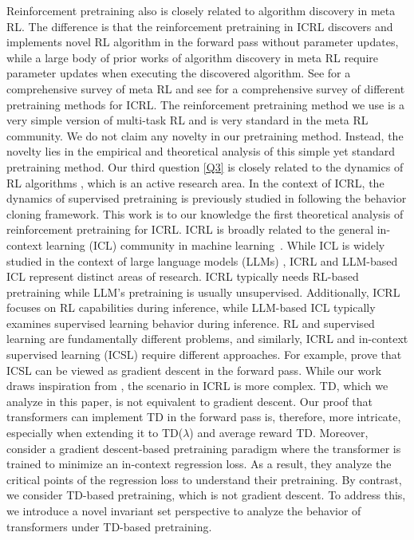 \documentclass{article}
\begin{document}
Reinforcement pretraining also is closely related to algorithm discovery in meta RL.
The difference is that the reinforcement pretraining in ICRL discovers and implements novel RL algorithm in the forward pass without parameter updates,
while a large body of prior works of algorithm discovery in meta RL \citep{kirsch2019improving,oh2020discovering,lu2022discovered} require parameter updates when executing the discovered algorithm.
See \citet{beck2023survey} for a comprehensive survey of meta RL
and see \citet{moeini2025survey} for a comprehensive survey of different pretraining methods for ICRL.
The reinforcement pretraining method we use is a very simple version of multi-task RL and is very standard in the meta RL community.
We do not claim any novelty in our pretraining method.
Instead,
the novelty lies in the empirical and theoretical analysis of this simple yet standard pretraining method.
Our third question \ref{Q3} is closely related to the dynamics of RL algorithms \citep{borkar2000ode,bhandari2018finite,cai2019neural,qian2024almost,liu2024ode},
which is an active research area.
In the context of ICRL,
the dynamics of supervised pretraining is previously studied in \citet{lin2023transformers} following the behavior cloning framework.
This work is to our knowledge the first theoretical analysis of reinforcement pretraining for ICRL.
ICRL is broadly related to the general in-context learning (ICL) community in machine learning~\citep{garg2022can,muller2022transformers,akyurek2023learning,vonoswald2023transformers,zhao2023transformers,allen2023physics,mahankali2023one,ahn2024transformers,zhang2024trained}.
While ICL is widely studied in the context of large language models (LLMs) \citep{brown2020incontext}, ICRL and LLM-based ICL represent distinct areas of research.
ICRL typically needs RL-based pretraining while LLM's pretraining is usually unsupervised.
Additionally, ICRL focuses on RL capabilities during inference, while LLM-based ICL typically examines supervised learning behavior during inference.
RL and supervised learning are fundamentally different problems, and similarly, ICRL and in-context supervised learning (ICSL) require different approaches.
For example, \citet{ahn2024transformers} prove that ICSL can be viewed as gradient descent in the forward pass. While our work draws inspiration from \citet{ahn2024transformers}, the scenario in ICRL is more complex.
TD, which we analyze in this paper, is not equivalent to gradient descent.
Our proof that transformers can implement TD in the forward pass is, therefore, more intricate, especially when extending it to TD($\lambda$) and average reward TD.
Moreover,
\citet{ahn2024transformers} consider a gradient descent-based pretraining paradigm where the transformer is trained to minimize an in-context regression loss.
As a result, they analyze the critical points of the regression loss to understand their pretraining.
By contrast, we consider TD-based pretraining, which is not gradient descent.
To address this, we introduce a novel invariant set perspective to analyze the behavior of transformers under TD-based pretraining.
\end{document}
